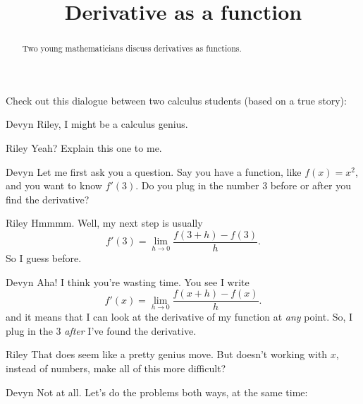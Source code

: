 \documentclass{ximera}
\title[Break-Ground:]{Derivative as a function}
\begin{document}
\begin{abstract}
Two young mathematicians discuss derivatives as
functions.
\end{abstract}
\maketitle

Check out this dialogue between two calculus students (based on a true
story):

\begin{dialogue}
\item[Devyn] Riley, I might be a calculus genius.
\item[Riley] Yeah?  Explain this one to me.
\item[Devyn] Let me first ask you a question.  Say you have a function, like 
 $f(x) = x^2$, and you want to know $f'(3)$.  Do
  you plug in the number $3$ before or after you find the derivative?
\item[Riley] Hmmmm. Well, my next step is usually
  \[
  f'(3) = \lim_{h\to 0}\frac{f(3+h)-f(3)}{h}.
  \]
  So I guess before.
\item[Devyn] Aha!  I think you're wasting time. You see I write
  \[
  f'(x) = \lim_{h\to 0}\frac{f(x+h)-f(x)}{h}.
  \]
  and it means that I can look at the derivative of my function at
  \textit{any} point.  So, I plug in the $3$ {\em after} I've found the derivative.
\item[Riley] That does seem like a pretty genius move. But doesn't working
 with $x$, instead of numbers, make all of this more difficult?
\item[Devyn] Not at all. Let's do the problems both ways, at the same time:
  \begin{image}
\end{image}
\end{dialogue}
\end{document}

